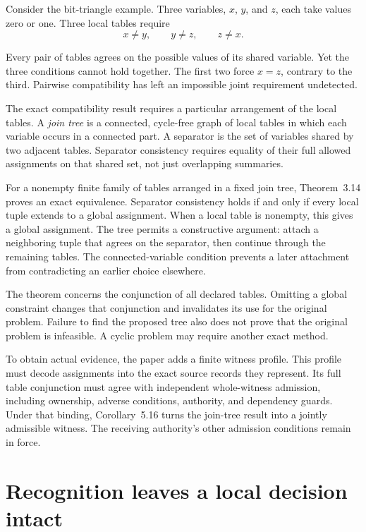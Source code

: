 \documentclass{momentum}
\begin{document}
Consider the bit-triangle example. Three variables, $x$, $y$, and $z$, each take values zero or one. Three local tables require
\[
x\ne y,\qquad y\ne z,\qquad z\ne x.
\]

Every pair of tables agrees on the possible values of its shared variable. Yet the three conditions cannot hold together. The first two force $x=z$, contrary to the third. Pairwise compatibility has left an impossible joint requirement undetected. \cite[Section~3.4, Example~3.13]{composes}

The exact compatibility result requires a particular arrangement of the local tables. A \emph{join tree} is a connected, cycle-free graph of local tables in which each variable occurs in a connected part. A separator is the set of variables shared by two adjacent tables. Separator consistency requires equality of their full allowed assignments on that shared set, not just overlapping summaries.

For a nonempty finite family of tables arranged in a fixed join tree, Theorem~3.14 proves an exact equivalence. Separator consistency holds if and only if every local tuple extends to a global assignment. When a local table is nonempty, this gives a global assignment. The tree permits a constructive argument: attach a neighboring tuple that agrees on the separator, then continue through the remaining tables. The connected-variable condition prevents a later attachment from contradicting an earlier choice elsewhere. \cite[Section~3.4]{composes}

The theorem concerns the conjunction of all declared tables. Omitting a global constraint changes that conjunction and invalidates its use for the original problem. Failure to find the proposed tree also does not prove that the original problem is infeasible. A cyclic problem may require another exact method.

To obtain actual evidence, the paper adds a finite witness profile. This profile must decode assignments into the exact source records they represent. Its full table conjunction must agree with independent whole-witness admission, including ownership, adverse conditions, authority, and dependency guards. Under that binding, Corollary~5.16 turns the join-tree result into a jointly admissible witness. The receiving authority's other admission conditions remain in force. \cite[Section~5.5, Definition~5.15 and Corollary~5.16]{composes}

\section{Recognition leaves a local decision intact}
\end{document}
